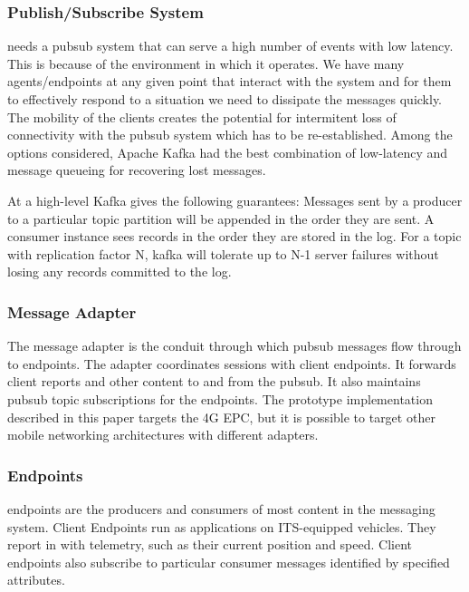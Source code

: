\subsubsection{Publish/Subscribe System}

\name{} needs a pubsub system that can serve a high number of events
with low latency. This is because of the environment in which it
operates.  We have many agents/endpoints at any given point that
interact with the system and for them to effectively respond to a
situation we need to dissipate the messages quickly. The mobility of
the clients creates the potential for intermitent loss of connectivity
with the pubsub system which has to be re-established. Among the options
considered, Apache Kafka had the best combination of low-latency and
message queueing for recovering lost messages.

At a high-level Kafka gives the following guarantees: Messages sent by a 
producer to a particular topic partition will be appended in the order they are
sent. A consumer instance sees records in the order they are stored in the log. 
For a topic with replication factor N, kafka will tolerate up to N-1 server 
failures without losing any records committed to the log.

\subsubsection{Message Adapter}

The \name{} message adapter is the conduit through which pubsub
messages flow through to endpoints. The adapter coordinates sessions
with client endpoints. It forwards client reports and other content to
and from the pubsub. It also maintains pubsub topic subscriptions for
the endpoints. The prototype implementation described in this
paper targets the 4G EPC, but it is possible to target other mobile
networking architectures with different adapters.

\subsubsection{Endpoints}

\name{} endpoints are the producers and consumers of most content in
the messaging system. Client Endpoints run as applications on
ITS-equipped vehicles.  They report in with telemetry, such as their
current position and speed.  Client endpoints also subscribe to
particular consumer messages identified by specified attributes.

